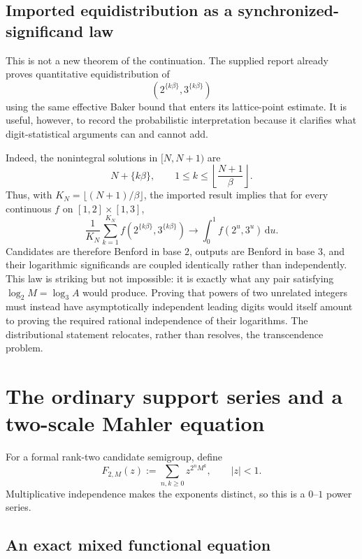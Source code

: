 \documentclass[11pt,oneside]{article}
\theoremstyle{definition}
\theoremstyle{remark}
\newcommand{\dd}{\,\mathrm d}
\begin{document}
\subsection{Imported equidistribution as a synchronized-significand law}

This is not a new theorem of the continuation.  The supplied report already proves quantitative equidistribution of
\[
  \left(2^{\{k\beta\}},3^{\{k\beta\}}\right)
\]
using the same effective Baker bound that enters its lattice-point estimate.  It is useful, however, to record the probabilistic interpretation because it clarifies what digit-statistical arguments can and cannot add.

Indeed, the nonintegral solutions in $[N,N+1)$ are
\[
  N+\{k\beta\},
  \qquad 1\le k\le\left\lfloor\frac{N+1}{\beta}\right\rfloor.
\]
Thus, with $K_N=\lfloor(N+1)/\beta\rfloor$, the imported result implies that for every continuous $f$ on $[1,2]\times[1,3]$,
\[
 \frac1{K_N}\sum_{k=1}^{K_N}
 f\!\left(2^{\{k\beta\}},3^{\{k\beta\}}\right)
 \longrightarrow
 \int_0^1 f(2^u,3^u)\dd u.
\]
Candidates are therefore Benford in base $2$, outputs are Benford in base $3$, and their logarithmic significands are coupled identically rather than independently.  This law is striking but not impossible: it is exactly what any pair satisfying $\log_2M=\log_3A$ would produce.  Proving that powers of two unrelated integers must instead have asymptotically independent leading digits would itself amount to proving the required rational independence of their logarithms.  The distributional statement relocates, rather than resolves, the transcendence problem.

\section{The ordinary support series and a two-scale Mahler equation}
\label{sec:mahler}

For a formal rank-two candidate semigroup, define
\begin{equation}
 F_{2,M}(z):=\sum_{n,k\ge0}z^{2^nM^k},
 \qquad |z|<1.
 \label{eq:support-series}
\end{equation}
Multiplicative independence makes the exponents distinct, so this is a $0$--$1$ power series.

\subsection{An exact mixed functional equation}
\end{document}
